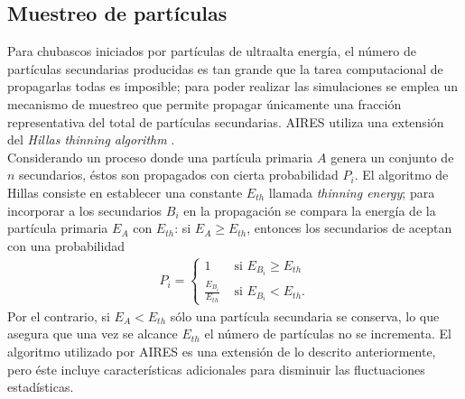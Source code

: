 	\subsection{Muestreo de partículas}
	Para chubascos iniciados por partículas de ultraalta energía, el número de partículas secundarias producidas es tan grande que la tarea computacional de propagarlas todas es imposible; para poder realizar las simulaciones se emplea un mecanismo de muestreo que permite propagar únicamente una fracción representativa del total de partículas secundarias. AIRES utiliza una extensión del \textit{Hillas thinning algorithm} \cite{Kobal2001}. \\
	
	Considerando un proceso donde una partícula primaria $A$ genera un conjunto de $n$ secundarios, éstos son propagados con cierta probabilidad $P_i$. El algoritmo de Hillas consiste en establecer una constante $E_{th}$ llamada \textit{thinning energy}; para incorporar a los secundarios $B_i$ en la propagación se compara la energía de la partícula primaria $E_A$ con $E_{th}$: si $E_A \geq E_{th}$, entonces los secundarios de aceptan con una probabilidad
	\begin{align}
	P_i = \begin{cases}
	1 & \text{ si } E_{B_i} \geq E_{th} \\
	\frac{E_{B_i}}{E_{th}} & \text{ si } E_{B_i} < E_{th}.
	\end{cases}
	\end{align}
	Por el contrario, si $E_A < E_{th}$ sólo una partícula secundaria se conserva, lo que asegura que una vez se alcance $E_{th}$ el número de partículas no se incrementa. El algoritmo utilizado por AIRES es una extensión de lo descrito anteriormente, pero éste incluye características adicionales para disminuir las fluctuaciones estadísticas.

\singlespacing